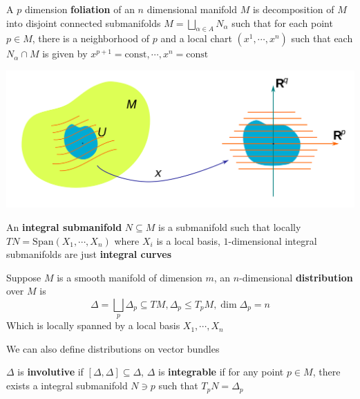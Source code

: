 \documentclass[../main.tex]{subfiles}
\begin{document}
\begin{definition}
A $p$ dimension \textbf{foliation} of an $n$ dimensional manifold $M$ is decomposition of $M$ into disjoint connected submanifolds $\displaystyle M=\bigsqcup_{\alpha\in A} N_\alpha$ such that for each point $p\in M$, there is a neighborhood of $p$ and a local chart $(x^1,\cdots,x^n)$ such that each $N_\alpha\cap M$ is given by $x^{p+1}=\mathrm{const},\cdots,x^n=\mathrm{const}$
\begin{center}
\includegraphics[scale=0.1]{Pictures/Foliation.png}
\end{center}
\end{definition}

\begin{definition}
An \textbf{integral submanifold} $N\subseteq M$ is a submanifold such that locally $TN=\mathrm{Span}(X_1,\cdots,X_n)$ where $X_i$ is a local basis, $1$-dimensional integral submanifolds are just \textbf{integral curves}
\end{definition}

\begin{definition}
Suppose $M$ is a smooth manifold of dimension $m$, an $n$-dimensional \textbf{distribution} over $M$ is
\[\Delta=\bigsqcup_{p}\Delta_p\subseteq TM, \Delta_p\leq T_pM, \dim\Delta_p=n\]
Which is locally spanned by a local basis $X_1,\cdots,X_n$
\end{definition}

\begin{remark}
We can also define distributions on vector bundles
\end{remark}

\begin{definition}
$\Delta$ is \textbf{involutive} if $[\Delta,\Delta]\subseteq\Delta$, $\Delta$ is \textbf{integrable} if for any point $p\in M$, there exists a integral submanifold $N\ni p$ such that $T_pN=\Delta_p$
\end{definition}
\end{document}
